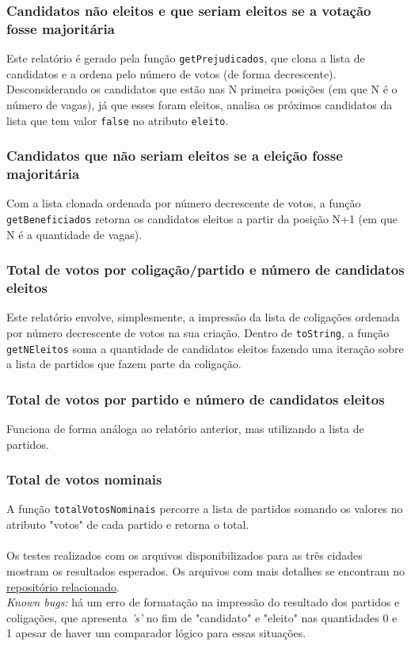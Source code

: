 \documentclass[12pt,a4paper]{article}
\begin{document}
\subsubsection*{Candidatos não eleitos e que seriam eleitos se a votação fosse majoritária}
Este relatório é gerado pela função \texttt{getPrejudicados}, que clona a lista de candidatos e a ordena pelo número de votos (de forma decrescente). Desconsiderando os candidatos que estão nas N primeira posições (em que N é o número de vagas), já que esses foram eleitos, analisa os próximos candidatos da lista que tem valor \texttt{false} no atributo \texttt{eleito}.


\subsubsection*{Candidatos que não seriam eleitos se a eleição fosse majoritária}
Com a lista clonada ordenada por número decrescente de votos, a função \texttt{getBeneficiados} retorna os candidatos eleitos a partir da posição N+1 (em que N é a quantidade de vagas).

\subsubsection*{Total de votos por coligação/partido e número de candidatos eleitos}
Este relatório envolve, simplesmente, a impressão da lista de coligações ordenada por número decrescente de votos na sua criação. Dentro de \texttt{toString}, a função \texttt{getNEleitos} soma a quantidade de candidatos eleitos fazendo uma iteração sobre a lista de partidos que fazem parte da coligação.

\subsubsection*{Total de votos por partido e número de candidatos eleitos}
Funciona de forma análoga ao relatório anterior, mas utilizando a lista de partidos.

\subsubsection*{Total de votos nominais}
A função \texttt{totalVotosNominais} percorre a lista de partidos somando os valores no atributo "votos" de cada partido e retorna o total.\\

\\Os testes realizados com os arquivos disponibilizados para as três cidades mostram os resultados esperados. Os arquivos com mais detalhes se encontram no \href{https://github.com/Smykke/lavajato-de-prog3}{repositório relacionado}.\\
\textit{Known bugs:} há um erro de formatação na impressão do resultado dos partidos e coligações, que apresenta \textit{'s'} no fim de "candidato" e "eleito" nas quantidades 0 e 1  apesar de haver um comparador lógico para essas situações.\\
\end{document}
